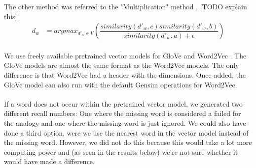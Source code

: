The other method was referred to the "Multiplication" method \cite{leviandgoldberg}. [TODO explain this] 
\begin{equation}
\begin{split}
\label{additionmethod}
d_w &= argmax_{d'_w \in V}(\dfrac{similarity(d'_w, c) similarity(d'_w, b)}{similarity(d'_w, a) + \epsilon} )
\end{split}
\end{equation}

\paragraph{}
We use freely available pretrained vector models for GloVe \cite{glovedata} and Word2Vec \cite{word2vecdata}. The GloVe models are almost the same format as the Word2Vec models. The only difference is that Word2Vec had a header with the dimensions. Once added, the GloVe model can also run with the default Gensim operations for Word2Vec.
\paragraph{}
If a word does not occur within the pretrained vector model, we generated two different recall numbers: One where the missing word is considered a failed for the analogy and one where the missing word is just ignored. We could also have done a third option, were we use the nearest word in the vector model instead of the missing word. However, we did not do this because this would take a lot more computing power and (as seen in the results below) we're not sure whether it would have made a difference.